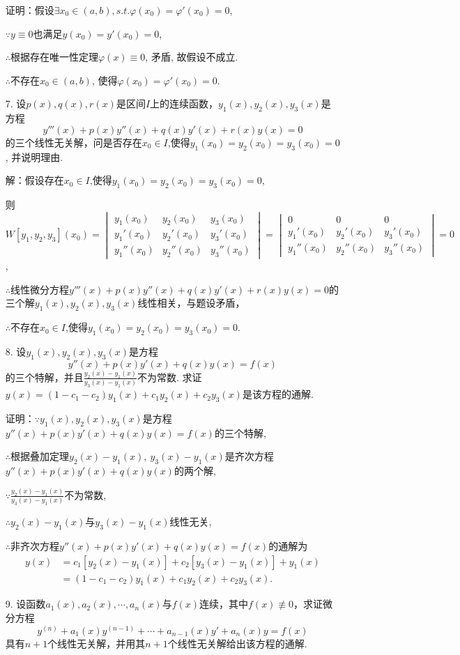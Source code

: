 \documentclass[12pt,UTF8,fleqn]{ctexart}
\begin{document}
\begin{enumerate}
证明：假设$\exists x_0\in(a,b),s.t.\varphi(x_0)=\varphi'(x_0)=0$,

$\because y\equiv0$也满足$y(x_0)=y'(x_0)=0$,

$\therefore$根据存在唯一性定理$\varphi(x)\equiv0$, 矛盾, 故假设不成立.

$\therefore$不存在$x_0\in(a,b)$, 使得$\varphi(x_0)=\varphi'(x_0)=0$.

\item[7.]设$p(x),q(x),r(x)$是区间$I$上的连续函数，$y_1(x),y_2(x),y_3(x)$是方程\[y'''(x)+p(x)y''(x)+q(x)y'(x)+r(x)y(x)=0\]的三个线性无关解，问是否存在$x_0\in I$,使得$y_1(x_0)=y_2(x_0)=y_3(x_0)=0$, 并说明理由.

解：假设存在$x_0\in I$,使得$y_1(x_0)=y_2(x_0)=y_3(x_0)=0$,

则$W[y_1,y_2,y_3](x_0)=\begin{vmatrix}y_1(x_0)&y_2(x_0)&y_3(x_0)\\ y_1'(x_0)&y_2'(x_0)&y_3'(x_0)\\y_1''(x_0)&y_2''(x_0)&y_3''(x_0)\end{vmatrix}=\begin{vmatrix}0&0&0\\ y_1'(x_0)&y_2'(x_0)&y_3'(x_0)\\y_1''(x_0)&y_2''(x_0)&y_3''(x_0)\end{vmatrix}=0$,

$\therefore$线性微分方程$y'''(x)+p(x)y''(x)+q(x)y'(x)+r(x)y(x)=0$的三个解$y_1(x),y_2(x),y_3(x)$线性相关，与题设矛盾，

$\therefore$不存在$x_0\in I$,使得$y_1(x_0)=y_2(x_0)=y_3(x_0)=0$.

\item[8.]设$y_1(x),y_2(x),y_3(x)$是方程\[y''(x)+p(x)y'(x)+q(x)y(x)=f(x)\]的三个特解，并且$\frac{y_2(x)-y_1(x)}{y_3(x)-y_1(x)}$不为常数. 求证$y(x)=(1-c_1-c_2)y_1(x)+c_1y_2(x)+c_2y_3(x)$是该方程的通解.

证明：$\because y_1(x),y_2(x),y_3(x)$是方程$y''(x)+p(x)y'(x)+q(x)y(x)=f(x)$的三个特解,

$\therefore$根据叠加定理$y_2(x)-y_1(x),\ y_3(x)-y_1(x)$是齐次方程$y''(x)+p(x)y'(x)+q(x)y(x)$的两个解, 

$\because\frac{y_2(x)-y_1(x)}{y_3(x)-y_1(x)}$不为常数,

$\therefore y_2(x)-y_1(x)$与$y_3(x)-y_1(x)$线性无关,

$\therefore$非齐次方程$y''(x)+p(x)y'(x)+q(x)y(x)=f(x)$的通解为
\[\begin{aligned}
y(x)&=c_1[y_2(x)-y_1(x)]+c_2[y_3(x)-y_1(x)]+y_1(x)\\
&=(1-c_1-c_2)y_1(x)+c_1y_2(x)+c_2y_3(x).
\end{aligned}\]
\item[9.]设函数$a_1(x),a_2(x),\cdots,a_n(x)$与$f(x)$连续，其中$f(x)\not\equiv0$，求证微分方程
\[y^{(n)}+a_1(x)y^{(n-1)}+\cdots+a_{n-1}(x)y'+a_n(x)y=f(x)\]
具有$n+1$个线性无关解，并用其$n+1$个线性无关解给出该方程的通解.


\end{enumerate}
\end{document}
